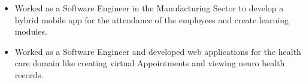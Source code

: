 \documentclass[10pt,a4paper,ragged2e,withhyper]{altacv}
\begin{document}
\begin{paracol}{2}
\begin{itemize}
 


\end{itemize}

\divider


\begin{itemize}
\item Worked as a Software Engineer in the Manufacturing Sector to develop a hybrid mobile app for the attendance of the employees and create learning modules.

\end{itemize}
\divider
{}

\begin{itemize}
\item Worked as a Software Engineer and developed web applications for the health care domain like creating virtual Appointments and viewing neuro health records.

\end{itemize}







\end{paracol}
\end{document}
